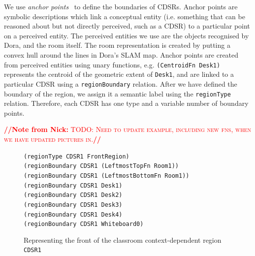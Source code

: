\documentclass[letterpaper]{article}
\newcommand{\from}[2]{\textcolor{red}{\noindent\textbf{//}\textbf{Note
      from #1:}\textsc{ #2}\textbf{//}}}
\newcommand{\fw}[1]{\texttt{#1}}
\begin{document}
We use \textit{anchor points}~\cite{Klenk/etal2005} to define the boundaries of CDSRs. Anchor points are symbolic descriptions which link a conceptual entity (i.e. something that can be reasoned about but not directly perceived, such as a CDSR) to a particular point on a perceived entity. The perceived entities we use are the objects recognised by Dora, and the room itself. The room representation is created by putting a convex hull around the lines in Dora's SLAM map. Anchor points are created from perceived entities using unary functions, e.g. \fw{(CentroidFn Desk1)} represents the centroid of the geometric extent of \fw{Desk1}, and are linked to a particular CDSR using a \fw{regionBoundary} relation. After we have defined the boundary of the region, we assign it a semantic label using the \fw{regionType} relation. Therefore, each CDSR has one type and a variable number of boundary points.


\from{Nick}{TODO: Need to update example, including new fns, when we have updated pictures in.}

\begin{figure}[h]
	{\fontsize{8}{8} %
  
\fw{(regionType CDSR1 FrontRegion)\\
(regionBoundary CDSR1 (LeftmostTopFn Room1))\\
(regionBoundary CDSR1 (LeftmostBottomFn Room1))\\
(regionBoundary CDSR1 Desk1)\\
(regionBoundary CDSR1 Desk2)\\
(regionBoundary CDSR1 Desk3)\\
(regionBoundary CDSR1 Desk4)\\
(regionBoundary CDSR1 Whiteboard0)\\
}}
  \caption{Representing the front of the classroom context-dependent region \fw{CDSR1}}
  \label{fig:cdsr-reps}
\end{figure}
\end{document}
